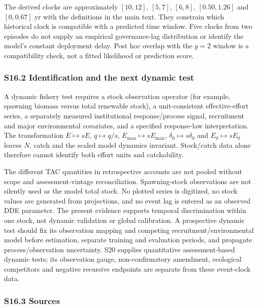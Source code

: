 \documentclass[
  10pt,
  a4paper,
]{article}
\begin{document}
The derived clocks are approximately \([10,12]\), \([5,7]\), \([6,8]\),
\([0.50,1.26]\) and \([0,0.67]\) yr with the definitions in the main
text. They constrain which historical clock is compatible with a
predicted time window. Five clocks from two episodes do not supply an
empirical governance-lag distribution or identify the model's constant
deployment delay. Post hoc overlap with the \(g=2\) window is a
compatibility check, not a fitted likelihood or prediction score.

\subsubsection{S16.2 Identification and the next dynamic
test}\label{s16.2-identification-and-the-next-dynamic-test}

A dynamic fishery test requires a stock observation operator (for
example, spawning biomass versus total renewable stock), a
unit-consistent effective-effort series, a separately measured
institutional response/process signal, recruitment and major
environmental covariates, and a specified response-law interpretation.
The transformation \(E\mapsto sE\), \(q\mapsto q/s\),
\(E_{\max}\mapsto sE_{\max}\), \(\delta_0\mapsto s\delta_0\) and
\(E_0\mapsto sE_0\) leaves \(N\), catch and the scaled model dynamics
invariant. Stock/catch data alone therefore cannot identify both effort
units and catchability.

The different TAC quantities in retrospective accounts are not pooled
without scope and assessment-vintage reconciliation. Spawning-stock
observations are not silently used as the model total stock. No plotted
series is digitized, no stock values are generated from projections, and
no event lag is entered as an observed DDE parameter. The present
evidence supports temporal discrimination within one stock, not dynamic
validation or global calibration. A prospective dynamic test should fix
its observation mapping and competing recruitment/environmental model
before estimation, separate training and evaluation periods, and
propagate process/observation uncertainty. S20 supplies quantitative
assessment-based dynamic tests; its observation gauge, non-confirmatory
amendment, ecological competitors and negative recursive endpoints are
separate from these event-clock data.

\subsubsection{S16.3 Sources}\label{s16.3-sources}
\end{document}
